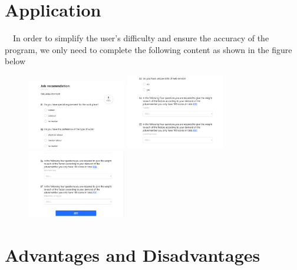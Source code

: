 \documentclass[12pt]{article}
\begin{document}
\section{Application}
~~In order to simplify the user's difficulty and ensure the accuracy of the program, we only need to complete the following content as shown in the figure below%
\begin{figure}[!htbp]
    \centering
    {
    \begin{minipage}[t]{0.3\linewidth}
    \centering
    \includegraphics[width=1.7in]{figure/t1.png}
    \end{minipage}%
    }%
    {
    \begin{minipage}[t]{0.3\linewidth}
    \centering
    \includegraphics[width=1.7in]{figure/t2.png}
    \end{minipage}%
    }%
    {
    \begin{minipage}[t]{0.3\linewidth}
    \centering
    \includegraphics[width=1.7in]{figure/t3.png}
    \end{minipage}
    }%
    \end{figure}
\section{Advantages and Disadvantages}%
\end{document}
